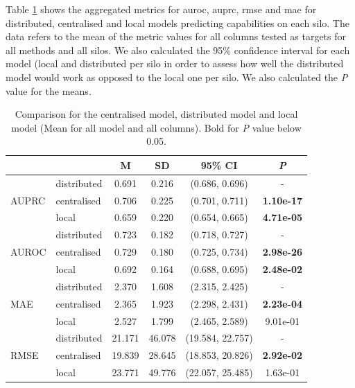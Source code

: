 
Table \ref{tab:allvsall} shows the aggregated metrics for \ac{auroc}, \ac{auprc}, \ac{rmse} and \ac{mae} for distributed, centralised and local models predicting capabilities on each silo. The data refers to the mean of the metric values for all columns tested as targets for all methods and all silos. We also calculated the 95\% confidence interval for each model (local and distributed per silo in order to assess how well the distributed model would work as opposed to the local one per silo. We also calculated the \textit{P} value for the means.

\begin{table}[htbp] 
 \setlength{\tabcolsep}{7pt} %
 \renewcommand{\arraystretch}{1.3} %
  \captionsetup{justification=centering} 
\centering
\caption[Metrics for centralised model, distributed model and local model]{Comparison for the centralised model, distributed model and local model (Mean for all model and all columns). Bold for \textit{P} value below 0.05.}
\label{tab:allvsall}
\begin{tabular}{llcccc}
\toprule
 &  & M & SD & 95\% CI & \textit{P}  \\
\midrule
\multirow[t]{3}{*}{AUPRC}
 & distributed & 0.691 & 0.216 & (0.686, 0.696) & - \\
  & centralised & 0.706 & 0.225 & (0.701, 0.711) & \bfseries 1.10e-17 \\
 & local & 0.659 & 0.220 & (0.654, 0.665) & \bfseries 4.71e-05 \\
 \hline

\multirow[t]{3}{*}{AUROC} 
 & distributed & 0.723 & 0.182 & (0.718, 0.727) & - \\
 & centralised & 0.729 & 0.180 & (0.725, 0.734) & \bfseries 2.98e-26 \\
 & local & 0.692 & 0.164 & (0.688, 0.695) & \bfseries 2.48e-02 \\

\hline

\multirow[t]{3}{*}{MAE} 
 & distributed & 2.370 & 1.608 & (2.315, 2.425) & - \\
 & centralised & 2.365 & 1.923 & (2.298, 2.431) & \bfseries 2.23e-04 \\
 & local & 2.527 & 1.799 & (2.465, 2.589) & 9.01e-01 \\

\hline

\multirow[t]{3}{*}{RMSE} 
 & distributed & 21.171 & 46.078 & (19.584, 22.757) & - \\
 & centralised & 19.839 & 28.645 & (18.853, 20.826) & \bfseries 2.92e-02 \\
 & local & 23.771 & 49.776 & (22.057, 25.485) & 1.63e-01 \\
\hline
\end{tabular}
\end{table}






